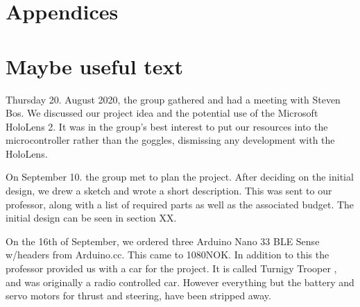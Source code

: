 \documentclass{article}
\begin{document}
\section{Appendices}







\newpage
\section{Maybe useful text}

Thursday 20. August 2020, the group gathered and had a meeting with Steven Bos. We discussed our project idea and the potential use of the Microsoft HoloLens 2. It was in the group's best interest to put our resources into the microcontroller rather than the goggles, dismissing any development with the HoloLens.

\vspace{5mm}
On September 10. the group met to plan the project. After deciding on the initial design, we drew a sketch and wrote a short description. This was sent to our professor, along with a list of required parts as well as the associated budget. The initial design can be seen in section XX.

\vspace{5mm}

On the 16th of September, we ordered three Arduino Nano 33 BLE Sense w/headers from Arduino.cc. This came to 1080NOK. In addition to this the professor provided us with a car for the project. It is called Turnigy Trooper \cite{CAR}, and was originally a radio controlled car. However everything but the battery and servo motors for thrust and steering, have been stripped away.
\end{document}
